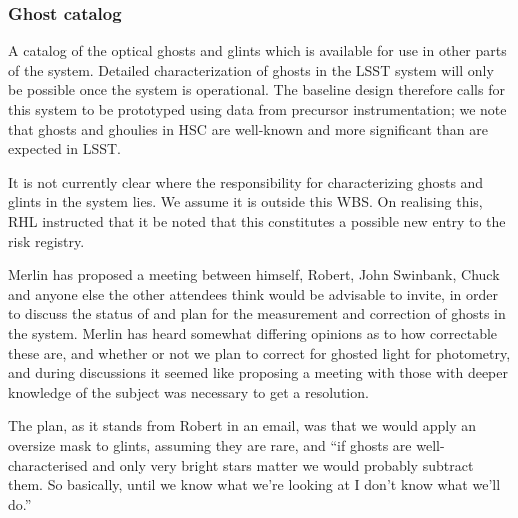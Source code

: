 \subsubsection{Ghost catalog}\label{sec:CPP:output:GhostCatalog} 
A catalog of the optical ghosts and glints which is available for use in other parts of the system. Detailed characterization of ghosts in the LSST system will only be possible once the system is operational. The baseline design therefore calls for this system to be prototyped using data from precursor instrumentation; we note that ghosts and ghoulies in \eg HSC are well-known and more significant than are expected in LSST.
\begin{note}
It is not currently clear where the responsibility for characterizing ghosts and glints in the system lies. We assume it is outside this WBS. On realising this, RHL instructed that it be noted that this constitutes a possible new entry to the risk registry.
\end{note}
\begin{note}
Merlin has proposed a meeting between himself, Robert, John Swinbank, Chuck and anyone else the other attendees think would be advisable to invite, in order to discuss the status of and plan for the measurement and correction of ghosts in the system. Merlin has heard somewhat differing opinions as to how correctable these are, and whether or not we plan to correct for ghosted light for photometry, and during discussions it seemed like proposing a meeting with those with deeper knowledge of the subject was necessary to get a resolution.

The plan, as it stands from Robert in an email, was that we would apply an oversize mask to glints, assuming they are rare, and ``if ghosts are well-characterised and only very bright stars matter we would probably subtract them. So basically, until we know what we're looking at I don't know what we'll do.''
\end{note}



%
%


